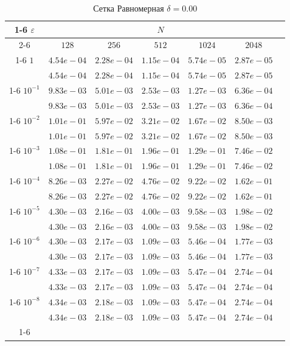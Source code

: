 \documentclass[10pt,twoside]{uz_kgu}
\begin{document}
\begin{table} [!htb]
    \caption {Сетка Равномерная $\delta = 0.00$}
        \begin{center}
\begin{tabular}{|c|c|c|c|c|c|c}
\cline{1-6} $\varepsilon$ & \multicolumn{5}{c|}{$N$} \\
\cline{2-6} &$128$ & $256$ & $512$  & $1024$& $2048$\\

\cline{1-6}
$1$
&$4.54e-04$&$2.28e-04$&$1.15e-04$&$5.74e-05$&$2.87e-05$\\
&$4.54e-04$&$2.28e-04$&$1.15e-04$&$5.74e-05$&$2.87e-05$\\
\cline{1-6}
$10^{-1}$
&$9.83e-03$&$5.01e-03$&$2.53e-03$&$1.27e-03$&$6.36e-04$\\
&$9.83e-03$&$5.01e-03$&$2.53e-03$&$1.27e-03$&$6.36e-04$\\
\cline{1-6}
$10^{-2}$
&$1.01e-01$&$5.97e-02$&$3.21e-02$&$1.67e-02$&$8.50e-03$\\
&$1.01e-01$&$5.97e-02$&$3.21e-02$&$1.67e-02$&$8.50e-03$\\
\cline{1-6}
$10^{-3}$
&$1.08e-01$&$1.81e-01$&$1.96e-01$&$1.29e-01$&$7.46e-02$\\
&$1.08e-01$&$1.81e-01$&$1.96e-01$&$1.29e-01$&$7.46e-02$\\
\cline{1-6}
$10^{-4}$
&$8.26e-03$&$2.27e-02$&$4.76e-02$&$9.22e-02$&$1.62e-01$\\
&$8.26e-03$&$2.27e-02$&$4.76e-02$&$9.22e-02$&$1.62e-01$\\
\cline{1-6}
$10^{-5}$
&$4.30e-03$&$2.16e-03$&$4.00e-03$&$9.58e-03$&$1.98e-02$\\
&$4.30e-03$&$2.16e-03$&$4.00e-03$&$9.58e-03$&$1.98e-02$\\
\cline{1-6}
$10^{-6}$
&$4.30e-03$&$2.17e-03$&$1.09e-03$&$5.46e-04$&$1.77e-03$\\
&$4.30e-03$&$2.17e-03$&$1.09e-03$&$5.46e-04$&$1.77e-03$\\
\cline{1-6}
$10^{-7}$
&$4.33e-03$&$2.17e-03$&$1.09e-03$&$5.47e-04$&$2.74e-04$\\
&$4.33e-03$&$2.17e-03$&$1.09e-03$&$5.47e-04$&$2.74e-04$\\
\cline{1-6}
$10^{-8}$
&$4.34e-03$&$2.18e-03$&$1.09e-03$&$5.47e-04$&$2.74e-04$\\
&$4.34e-03$&$2.18e-03$&$1.09e-03$&$5.47e-04$&$2.74e-04$\\
\cline{1-6}
\cline{1-6}
        \end{tabular}
    \end{center}
\end{table}
\end{document}

